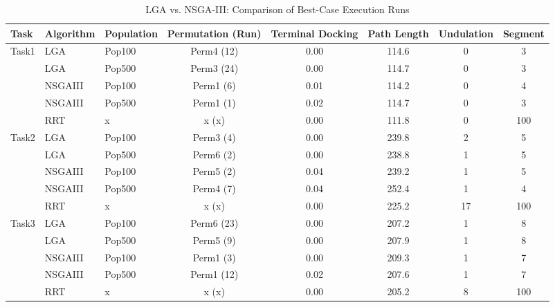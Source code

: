 \documentclass[8pt]{article}
\begin{document}
\begin{table}[htbp]
\centering
\caption{LGA vs. NSGA-III: Comparison of Best-Case Execution Runs}
\label{tab:worst_case_failures}
\begin{tabular}{lllc cccc}
\toprule
Task & Algorithm & Population & Permutation (Run) & Terminal Docking & Path Length & Undulation & Segment \\
\midrule
Task1 & LGA & Pop100 & Perm4 (12) & 0.00 & 114.6 & 0 & 3 \\
 & LGA & Pop500 & Perm3 (24) & 0.00 & 114.7 & 0 & 3 \\
 & NSGAIII & Pop100 & Perm1 (6) & 0.01 & 114.2 & 0 & 4 \\
 & NSGAIII & Pop500 & Perm1 (1) & 0.02 & 114.7 & 0 & 3 \\
 & RRT & x & x (x) & 0.00 & 111.8 & 0 & 100 \\
\midrule
Task2 & LGA & Pop100 & Perm3 (4) & 0.00 & 239.8 & 2 & 5 \\
 & LGA & Pop500 & Perm6 (2) & 0.00 & 238.8 & 1 & 5 \\
 & NSGAIII & Pop100 & Perm5 (2) & 0.04 & 239.2 & 1 & 5  \\
 & NSGAIII & Pop500 & Perm4 (7) & 0.04 & 252.4 & 1 & 4 \\
  & RRT & x & x (x) & 0.00 & 225.2 & 17 & 100 \\
\midrule
Task3 & LGA & Pop100 & Perm6 (23) & 0.00 & 207.2 & 1 & 8 \\
 & LGA & Pop500 & Perm5 (9) & 0.00 & 207.9 & 1 & 8 \\
 & NSGAIII & Pop100 & Perm1 (3) & 0.00 & 209.3 & 1 & 7 \\
 & NSGAIII & Pop500 & Perm1 (12) & 0.02 & 207.6 & 1 & 7 \\
 & RRT & x & x (x) & 0.00 & 205.2 & 8 & 100 \\
\bottomrule
\end{tabular}
\end{table}
\end{document}
